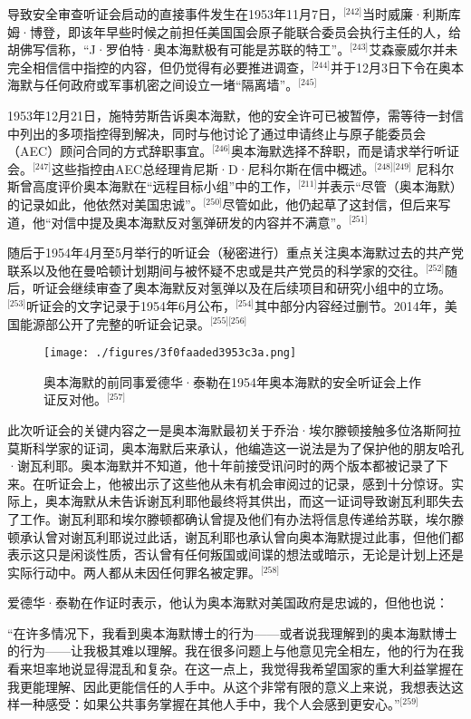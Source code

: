 导致安全审查听证会启动的直接事件发生在1953年11月7日，\(^\text{[242]}\)当时威廉·利斯库姆·博登，即该年早些时候之前担任美国国会原子能联合委员会执行主任的人，给胡佛写信称，“J·罗伯特·奥本海默极有可能是苏联的特工”。\(^\text{[243]}\)艾森豪威尔并未完全相信信中指控的内容，但仍觉得有必要推进调查，\(^\text{[244]}\)并于12月3日下令在奥本海默与任何政府或军事机密之间设立一堵“隔离墙”。\(^\text{[245]}\)

1953年12月21日，施特劳斯告诉奥本海默，他的安全许可已被暂停，需等待一封信中列出的多项指控得到解决，同时与他讨论了通过申请终止与原子能委员会（AEC）顾问合同的方式辞职事宜。\(^\text{[246]}\)奥本海默选择不辞职，而是请求举行听证会。\(^\text{[247]}\)这些指控由AEC总经理肯尼斯·D·尼科尔斯在信中概述。\(^\text{[248][249]}\) 尼科尔斯曾高度评价奥本海默在“远程目标小组”中的工作，\(^\text{[211]}\)并表示“尽管（奥本海默）的记录如此，他依然对美国忠诚”。\(^\text{[250]}\)尽管如此，他仍起草了这封信，但后来写道，他“对信中提及奥本海默反对氢弹研发的内容并不满意”。\(^\text{[251]}\)

随后于1954年4月至5月举行的听证会（秘密进行）重点关注奥本海默过去的共产党联系以及他在曼哈顿计划期间与被怀疑不忠或是共产党员的科学家的交往。\(^\text{[252]}\)随后，听证会继续审查了奥本海默反对氢弹以及在后续项目和研究小组中的立场。\(^\text{[253]}\)听证会的文字记录于1954年6月公布，\(^\text{[254]}\)其中部分内容经过删节。2014年，美国能源部公开了完整的听证会记录。\(^\text{[255][256]}\)
\begin{figure}[ht]
\centering
\texttt{[image: ./figures/3f0faaded3953c3a.png]}
\caption{奥本海默的前同事爱德华·泰勒在1954年奥本海默的安全听证会上作证反对他。\(^\text{[257]}\)} \label{fig_ABHM_13}
\end{figure}
此次听证会的关键内容之一是奥本海默最初关于乔治·埃尔滕顿接触多位洛斯阿拉莫斯科学家的证词，奥本海默后来承认，他编造这一说法是为了保护他的朋友哈孔·谢瓦利耶。奥本海默并不知道，他十年前接受讯问时的两个版本都被记录了下来。在听证会上，他被出示了这些他从未有机会审阅过的记录，感到十分惊讶。实际上，奥本海默从未告诉谢瓦利耶他最终将其供出，而这一证词导致谢瓦利耶失去了工作。谢瓦利耶和埃尔滕顿都确认曾提及他们有办法将信息传递给苏联，埃尔滕顿承认曾对谢瓦利耶说过此话，谢瓦利耶也承认曾向奥本海默提过此事，但他们都表示这只是闲谈性质，否认曾有任何叛国或间谍的想法或暗示，无论是计划上还是实际行动中。两人都从未因任何罪名被定罪。\(^\text{[258]}\)

爱德华·泰勒在作证时表示，他认为奥本海默对美国政府是忠诚的，但他也说：

“在许多情况下，我看到奥本海默博士的行为——或者说我理解到的奥本海默博士的行为——让我极其难以理解。我在很多问题上与他意见完全相左，他的行为在我看来坦率地说显得混乱和复杂。在这一点上，我觉得我希望国家的重大利益掌握在我更能理解、因此更能信任的人手中。从这个非常有限的意义上来说，我想表达这样一种感受：如果公共事务掌握在其他人手中，我个人会感到更安心。”\(^\text{[259]}\)

